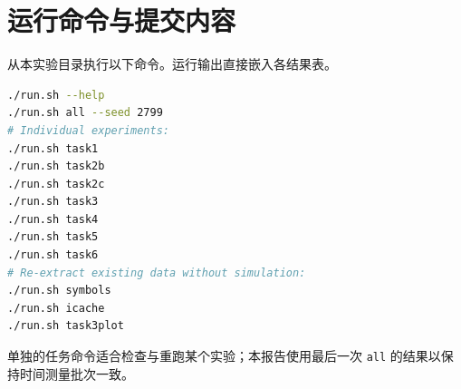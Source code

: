 \documentclass[12pt,a4paper,fontset=mac]{ctexart}
\begin{document}
\section{运行命令与提交内容}
从本实验目录执行以下命令。运行输出直接嵌入各结果表。
\begin{lstlisting}[language=bash]
./run.sh --help
./run.sh all --seed 2799
# Individual experiments:
./run.sh task1
./run.sh task2b
./run.sh task2c
./run.sh task3
./run.sh task4
./run.sh task5
./run.sh task6
# Re-extract existing data without simulation:
./run.sh symbols
./run.sh icache
./run.sh task3plot
\end{lstlisting}
单独的任务命令适合检查与重跑某个实验；本报告使用最后一次 \texttt{all} 的结果以保持时间测量批次一致。
\end{document}

